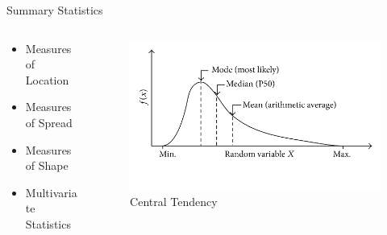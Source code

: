 \documentclass[10pt,aspectratio=169]{beamer} %
\newcommand{\hide}[1] {
	\textcolor{hiddencolor}{#1}
}
\begin{document}
\begin{frame}{Summary Statistics}
\begin{columns}[c]
\begin{column}{0.35\textwidth}
\begin{itemize}
\item \alert{Measures of Location }
\item \hide{Measures of Spread}
\item \hide{Measures of Shape}
\item \hide{Multivariate Statistics}
\end{itemize}
\end{column}

\begin{column}{0.65\textwidth}
\begin{figure}
    \includegraphics[width=\textwidth]{measure_location.png}
    \caption{Central Tendency}
\end{figure}
\end{column}
\end{columns}
\end{frame}
\end{document}

